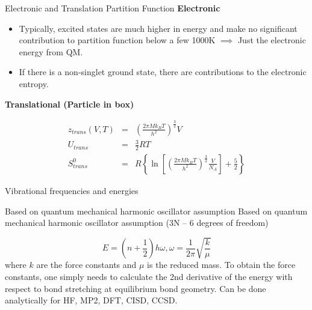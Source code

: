 \documentclass[aspectratio=169]{beamer}
\begin{document}
    \begin{frame}{Electronic and Translation Partition Function}
        \textbf{Electronic}
        \begin{itemize}
            \item Typically, excited states are much higher in energy and make no significant contribution to partition function below a few 1000K $\implies$ Just the electronic energy from QM.
            \item If there is a non-singlet ground state, there are contributions to the electronic entropy.
        \end{itemize}

        \textbf{Translational (Particle in box)}

        \begin{eqnarray*}
            z_{trans}(V, T) & = & \left( \frac{2\pi Mk_BT}{h^2} \right)^{\frac{3}{2}} V\\
            U_{trans} & = & \frac{3}{2} RT\\
            S_{trans}^0 & = & R\left \{ \ln \left [{\left( \frac{2\pi Mk_BT}{h^2} \right) ^{\frac{3}{2}}}  \frac{V}{N_A} \right ] + \frac{5}{2} \right  \}
        \end{eqnarray*}

    \end{frame}


    \begin{frame}{Vibrational frequencies and energies}

        Based on quantum mechanical harmonic oscillator assumption Based on quantum mechanical harmonic oscillator assumption (3N – 6 degrees of freedom)

        \begin{equation*}
            E = (n+\frac{1}{2})h\omega,  \omega = \frac{1}{2\pi}\sqrt{\frac{k}{\mu}}
        \end{equation*}
        where $k$ are the force constants and $\mu$ is the reduced mass.\newline
        \newline
        To obtain the force constants, one simply needs to calculate the 2nd derivative of the energy with respect to bond stretching at equilibrium bond geometry.\newline
        \newline
        Can be done analytically for HF, MP2, DFT, CISD, CCSD.

    \end{frame}
\end{document}
